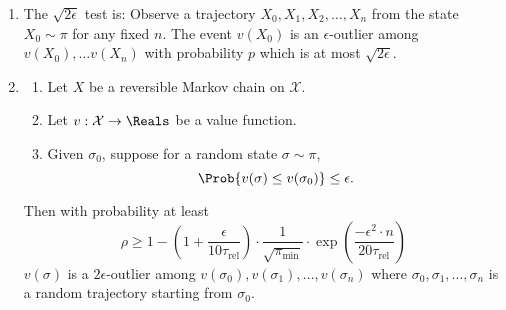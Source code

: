 \documentclass[12pt]{article}
\begin{document}
\begin{enumerate}
    \item
        The \( \sqrt{2\epsilon} \) test is:  Observe a trajectory \( X_0,
        X_1, X_2, \dots, X_n \) from the state \( X_0 \sim \pi \) for
        any fixed \( n \).  The event \( v(X_0) \) is an \( \epsilon \)-outlier
        among \( v(X_0), \dots v(X_n ) \) with probability \( p \) which
        is at most \( \sqrt {2\epsilon} \).
    \item
        \begin{theorem}
            \begin{enumerate}
                \item
                    Let \( X \) be a reversible Markov chain on \(
                    \mathcal{X} \).
                \item
                    Let \( v :  \mathcal{X} \to \Reals \) be a value
                    function.
                \item
                    Given \( \sigma_0 \), suppose for a random state \(
                    \sigma \sim \pi \),
                    \[
                        \Prob{v(\sigma) \le v(\sigma_0)} \le \epsilon.
                    \]
            \end{enumerate}
            Then with probability at least
            \[
                \rho \ge 1 - \left( 1 + \frac{\epsilon}{10 \tau_{\text{rel}}}
                \right) \cdot \frac{1}{\sqrt{\pi_{\min}}} \cdot \exp
                \left( \frac {-\epsilon^ {2} \cdot n}{20 \tau_{\text{rel}}}
                \right)
            \] \( v(\sigma) \) is a \( 2\epsilon \)-outlier among \( v(\sigma_0),
            v(\sigma_1), \dots, v(\sigma_n) \) where \( \sigma_0, \sigma_1,
            \dots, \sigma_n \) is a random trajectory starting from \(
            \sigma_0 \).
        \end{theorem}
\end{enumerate}

\hr

\end{document}
